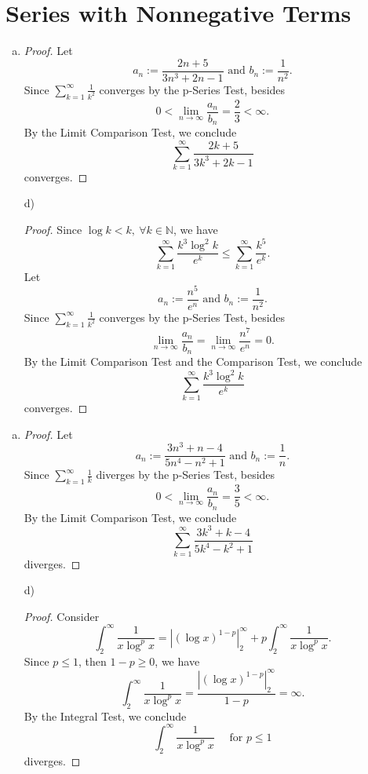 \documentclass{report}
\begin{document}
\section{Series with Nonnegative Terms}

\begin{Exercise}
\begin{enumerate}[a)]
\item 
\begin{proof}
Let $$a_n := \frac{2n+5}{3n^3+2n-1}\text{ and } b_n :=\frac{1}{n^2}.$$
Since $\sum_{k=1}^{\infty}\frac{1}{k^2}$ converges by the p-Series Test, besides
$$0<\lim_{n\to\infty}\frac{a_n}{b_n} = \frac{2}{3} < \infty.$$
By the Limit Comparison Test, we conclude $$\sum_{k=1}^{\infty}\frac{2k+5}{3k^3+2k-1}$$ converges.
\end{proof}

\item [d)]
\begin{proof}
Since $\log{k} < k,\ \forall k \in \mathbb{N}$, we have $$\sum_{k=1}^{\infty}\frac{k^3\log^2{k}}{e^k} \leq \sum_{k=1}^{\infty}\frac{k^5}{e^k}.$$
Let $$a_n := \frac{n^5}{e^n}\text{ and } b_n :=\frac{1}{n^2}.$$
Since $\sum_{k=1}^{\infty}\frac{1}{k^2}$ converges by the p-Series Test, besides
$$\lim_{n\to\infty}\frac{a_n}{b_n} = \lim_{n\to\infty}\frac{n^7}{e^n} = 0. $$
By the Limit Comparison Test and the Comparison Test, we conclude $$\sum_{k=1}^{\infty}\frac{k^3\log^2{k}}{e^k}$$ converges.
\end{proof}
\end{enumerate}
\end{Exercise}

\vspace{12pt}
\begin{Exercise}
\begin{enumerate}[a)]
\item 
\begin{proof}
Let $$a_n := \frac{3n^3+n-4}{5n^4-n^2+1}\text{ and } b_n :=\frac{1}{n}.$$
Since $\sum_{k=1}^{\infty}\frac{1}{k}$ diverges by the p-Series Test, besides
$$0<\lim_{n\to\infty}\frac{a_n}{b_n} = \frac{3}{5} < \infty.$$
By the Limit Comparison Test, we conclude $$\sum_{k=1}^{\infty}\frac{3k^3+k-4}{5k^4-k^2+1}$$ diverges.
\end{proof}

\item [d)]
\begin{proof}
Consider $$\int_{2}^{\infty}\frac{1}{x\log^p{x}} = \left|(\log{x})^{1-p}\right|_{2}^{\infty} + p\int_{2}^{\infty}\frac{1}{x\log^p{x}}.$$
Since $p \leq 1$, then $1-p \geq 0$, we have $$\int_{2}^{\infty}\frac{1}{x\log^p{x}} = \frac{\left|(\log{x})^{1-p}\right|_{2}^{\infty}}{1-p} = \infty.$$
By the Integral Test, we conclude $$\int_{2}^{\infty}\frac{1}{x\log^p{x}}\quad\mbox{ for }p \leq 1$$
diverges.
\end{proof}
\end{enumerate}
\end{Exercise}
\end{document}
